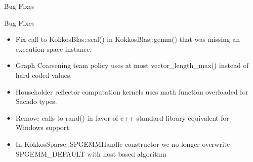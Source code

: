 \begin{frame}[fragile]

  {\Huge Bug Fixes}

  \vspace{10pt}

\end{frame}

\begin{frame}[fragile]{Bug Fixes}
  \begin{itemize}
  \item Fix call to {\ttfamily KokkosBlas::scal()} in {\ttfamily KokkosBlas::gemm()} that was missing an execution space instance.
  \item Graph Coarsening team policy uses at most {\ttfamily vector\_length\_max()} instead of hard coded values.
  \item Householder reflector computation kernels uses math function overloaded for Sacado types.
  \item Remove calls to {\ttfamily rand()} in favor of c++ standard library equivalent for Windows support.
  \item In {\ttfamily KokkosSparse::SPGEMMHandle} constructor we no longer overwrite {\ttfamily SPGEMM\_DEFAULT} with host based algorithm
  \end{itemize}
\end{frame}
